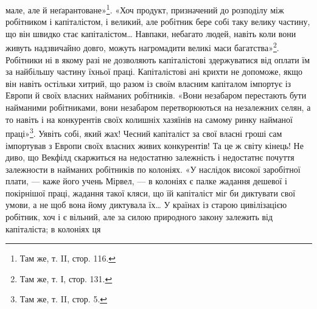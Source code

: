 \parcont{}  %
мале, але й неґарантоване»\footnote{
Там же, т. II, стор. 116.
}. «Хоч продукт, призначений до розподілу між робітником і капіталістом,
і великий, але робітник бере собі таку велику частину, що він швидко стає капіталістом\dots{} Навпаки,
небагато людей, навіть коли вони живуть надзвичайно довго, можуть нагромадити великі маси
багатства»\footnote{
Там же, т. І, стор. 131.
}. Робітники ні в якому разі не дозволяють капіталістові здержуватися від оплати їм за
найбільшу частину їхньої праці. Капіталістові ані крихти не допоможе, якщо він навіть
остільки хитрий, що разом із своїм власним капіталом імпортує із Европи й своїх власних найманих
робітників. «Вони незабаром перестають бути найманими робітниками, вони незабаром перетворюються на
незалежних селян, а то навіть і на конкурентів своїх колишніх хазяїнів на самому ринку найманої
праці»\footnote{
Там же, т. II, стор. 5.
}. Уявіть собі, який жах! Чесний капіталіст за свої власні гроші сам імпортував з Европи
своїх власних живих конкурентів! Та це ж світу кінець! Не диво, що Векфілд скаржиться на недостатню
залежність і недостатнє почуття залежности в найманих робітників по колоніях. «У наслідок високої
заробітної плати, — каже його учень Мірвел, — в колоніях є палке жадання дешевої і покірнішої праці,
жадання такої кляси, що їй капіталіст
міг би диктувати свої умови, а не щоб вона йому диктувала їх\dots{} У країнах із старою цивілізацією
робітник, хоч і є вільний, але за силою природного закону залежить від капіталіста; в колоніях ця
